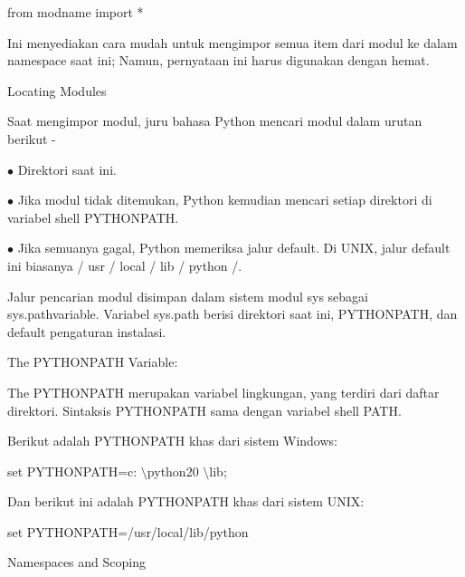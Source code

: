 \noindent 
 \hspace*{0.5in} from modname import * \par
\noindent 
Ini menyediakan cara mudah untuk mengimpor semua item dari modul ke dalam namespace saat ini; Namun, pernyataan ini harus digunakan dengan hemat. \par
\vspace{12pt}
\noindent 
Locating Modules \par
\noindent 
Saat mengimpor modul, juru bahasa Python mencari modul dalam urutan berikut - \par
\noindent 
 \hspace*{0.5in}  $ \bullet $ Direktori saat ini. \par
\noindent 
 \hspace*{0.5in}  $ \bullet $ Jika modul tidak ditemukan, Python kemudian mencari setiap direktori di variabel shell  \hspace*{0.5in} PYTHONPATH. \par
\noindent 
 \hspace*{0.5in}  $ \bullet $ Jika semuanya gagal, Python memeriksa jalur default. Di UNIX, jalur default ini  \hspace*{0.5in} biasanya / usr / local / lib / python /. \par
\vspace{12pt}
\noindent 
Jalur pencarian modul disimpan dalam sistem modul sys sebagai sys.pathvariable. Variabel sys.path berisi direktori saat ini, PYTHONPATH, dan default pengaturan instalasi. \par
\vspace{12pt}
\noindent 
The $  $PYTHONPATH $  $Variable: \par
\noindent 
The PYTHONPATH merupakan variabel lingkungan, yang terdiri dari daftar direktori. Sintaksis PYTHONPATH sama dengan variabel shell PATH. \par
\noindent 
Berikut adalah PYTHONPATH khas dari sistem Windows: \par
\noindent 
 \hspace*{0.5in} set PYTHONPATH=c: $  \setminus  $python20 $  \setminus  $lib; \par
\noindent 
Dan berikut ini adalah PYTHONPATH khas dari sistem UNIX: \par
\noindent 
 \hspace*{0.5in} set PYTHONPATH=/usr/local/lib/python \par
\vspace{12pt}
\noindent 
Namespaces and Scoping \par
